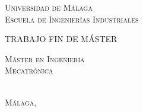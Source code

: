 
\thispagestyle{empty}


\begin{center}
	\Large \scshape
	Universidad de Málaga\\
	\bigskip
	Escuela de Ingenierías Industriales
\end{center}

\bigskip


\bigskip

\bigskip \bigskip \bigskip \bigskip

\begin{center}
	\Large \scshape
	TRABAJO FIN DE MÁSTER
\end{center}

\bigskip \bigskip \bigskip \bigskip

\begin{center}
	\huge \scshape
	\tfgtitlename %
\end{center}

\vfill

\begin{center}
	\Large \scshape
	Máster en Ingeniería\\
	Mecatrónica
\end{center}

\bigskip \bigskip \bigskip \bigskip


\begin{flushright}
	\large \scshape
	\tfgauthorname \\%
	Málaga, \tfganno %
\end{flushright}



\blankpage
